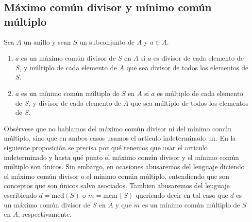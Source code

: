 \subsection{Máximo común divisor y mínimo común múltiplo}

\begin{definition}{}{}
Sea \(A\) un anillo y sean \(S\) un subconjunto de \(A\) y \(a \in A\).

\begin{enumerate}
    \item \(a\) es un máximo común divisor de \(S\) en \(A\) si \(a\) es divisor de cada elemento de \(S\), y múltiplo de cada elemento de \(A\) que sea divisor de todos los elementos de \(S\).

    \item \(a\) es un mínimo común múltiplo de \(S\) en \(A\) si \(a\) es múltiplo de cada elemento de \(S\), y divisor de cada elemento de \(A\) que sea múltiplo de todos los elementos de \(S\).
\end{enumerate}
\end{definition}

Obsérvese que no hablamos del máximo común divisor ni del mínimo común múltiplo, sino que en ambos casos usamos el articulo indeterminado un. En la siguiente proposición se precisa por qué tenemos que usar el articulo indeterminado y hasta qué punto el máximo común divisor y el mínimo común múltiplo son únicos. Sin embargo, en ocasiones abusaremos del lenguaje diciendo el máximo común divisor o el mínimo común múltiplo, entendiendo que son conceptos que son únicos salvo asociados. Tambien abusaremos del lenguaje escribiendo \(d = \mathrm{mcd}(S)\) o \(m = \mathrm{mcm}(S)\) queriendo decir en tal caso que \(d\) es un máximo común divisor de \(S\) en \(A\) y que \(m\) es un mínimo común múltiplo de \(S\) en \(A\), respectivamente.

